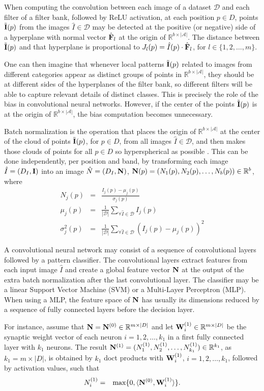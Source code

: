 \documentclass[10pt,twocolumn,letterpaper]{article}
\newcommand{\R}{\mathbb{R}}
\newcommand{\A}{\mathcal{A}}
\newcommand{\D}{\mathcal{D}}
\newcommand{\I}{\hat{I}}
\newcommand{\m}[1]{{\mathrm{\bf #1}}}
\newcommand{\E}{\tilde{\m{I}}}
\newcommand{\lI}{\m{I}}
\newcommand{\mF}{\m{F}}
\newcommand{\eF}{\hat{\mF}}
\newcommand{\gN}{\m{N}}
\newcommand{\W}{\m{W}}
\begin{document}
When computing the convolution between each image of a dataset $\D$ and each filter of a filter bank, followed by ReLU activation,
at each position $p\in D$, points $\E(p)$ from the
images $\I \in \D$ may be detected at the positive (or
negative) side of a hyperplane with normal vector $\eF_l$ at the origin of $\R^{b \times |\A|}$. The distance
between $\E(p)$ and that hyperplane is proportional to $J_l(p)
=\I(p) \cdot \eF_l$, for $l \in
\{1,2,\ldots,m\}$.

One can then imagine that whenever local patterns $\E(p)$ related to images from different categories appear as
distinct groups of points in $\R^{b\times |\A|}$, they should
be at different sides of the hyperplanes of the filter bank, so
different filters will be able to capture relevant details of distinct
classes. This is precisely the role of the bias in convolutional
neural networks. However, if the center of the points $\E(p)$ is at the origin of $\R^{b\times |\A|}$, the bias
computation becomes unnecessary.

Batch normalization is the operation that places the origin of
$\R^{b\times |\A|}$ at the center of the cloud of points
$\E(p)$, for $p\in D$, from all images $\hat{I}\in
\D$, and then makes those clouds of points for all $p\in D$ so
hyperspherical as possible \cite{ioffe2015batch}. This can be done independently, per
position and band, by transforming each image $\I=(D_I,\lI)$
into an image $\hat{N}=(D_I,{\bf N})$, ${\bf
  N}(p)=(N_1(p),N_2(p),\ldots,N_b(p))\in \R^b$, where
\begin{eqnarray}
  N_j(p) & = & \frac{I_j(p) - \mu_j(p)}{\sigma_j(p)} \\
  \mu_j(p) & = & \frac{1}{|\D|} \sum_{\forall \hat{I}\in \D} I_{j}(p) \\
  \sigma^2_j(p) & = & \frac{1}{|\D|} \sum_{\forall \hat{I}\in \D} \left(I_{j}(p)-\mu_j(p)\right)^2
\end{eqnarray}

A convolutional neural network may consist of a sequence of
convolutional layers followed by a pattern classifier. The
convolutional layers extract features from each input image $\I$
and create a global feature vector $\gN$ at the output of the
extra batch normalization after the last convolutional layer. The
classifier may be a linear Support Vector Machine (SVM) or a
Multi-Layer Perceptron (MLP). When using a MLP, the feature space of $\gN$ has usually
its dimensions reduced by a sequence of fully connected layers before
the decision layer.

For instance, assume that ${\gN}={\gN}^{(0)}\in \R^{m\times |D|}$
and let ${\W}^{(1)}_i \in \R^{m\times |D|}$ be the synaptic weight
vector of each neuron $i=1,2,\ldots,k_1$ in a first fully connected
layer with $k_1$ neurons. The result ${\gN}^{(1)}=(N^{(1)}_1,N^{(1)}_2,\ldots,N^{(1)}_{k_1})\in \R^{k_1}$, as
$k_1 = m\times |D|$, is obtained by $k_1$ doct products with ${\W}^{(1)}_i$, $i=1,2,\ldots,k_1$, followed by activation values, such that
\begin{eqnarray}
  N^{(1)}_i & = & \max\{0,\langle {\gN}^{(0)}, {\W}^{(1)}_i\rangle\}.
\end{eqnarray}
\end{document}
